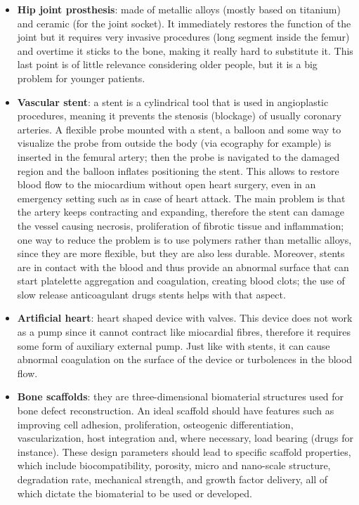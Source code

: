   \begin{multicols}{2}
    \begin{itemize}
      \item \textbf{Hip joint prosthesis}: made of metallic alloys (mostly based on titanium) and ceramic (for the joint socket).
        It immediately restores the function of the joint but it requires very invasive procedures (long segment inside the femur) and overtime it sticks to the bone, making it really hard to substitute it.
        This last point is of little relevance considering older people, but it is a big problem for younger patients.
      \item \textbf{Vascular stent}: a stent is a cylindrical tool that is used in angioplastic procedures, meaning it prevents the stenosis (blockage) of usually coronary arteries.
        A flexible probe mounted with a stent, a balloon and some way to visualize the probe from outside the body (via ecography for example) is inserted in the femural artery; then the probe is navigated to the damaged region and the balloon inflates positioning the stent.
        This allows to restore blood flow to the miocardium without open heart surgery, even in an emergency setting such as in case of heart attack.
        The main problem is that the artery keeps contracting and expanding, therefore the stent can damage the vessel causing necrosis, proliferation of fibrotic tissue and inflammation; one way to reduce the problem is to use polymers rather than metallic alloys, since they are more flexible, but they are also less durable.
        Moreover, stents are in contact with the blood and thus provide an abnormal surface that can start platelette aggregation and coagulation, creating blood clots; the use of slow release anticoagulant drugs stents helps with that aspect.
      \item \textbf{Artificial heart}: heart shaped device with valves.
        This device does not work as a pump since it cannot contract like miocardial fibres, therefore it requires some form of auxiliary external pump.
        Just like with stents, it can cause abnormal coagulation on the surface of the device or turbolences in the blood flow.
      \item \textbf{Bone scaffolds}: they are three-dimensional biomaterial structures used for bone defect reconstruction.
        An ideal scaffold should have features such as improving cell adhesion, proliferation, osteogenic differentiation, vascularization, host integration and, where necessary, load bearing (drugs for instance).
        These design parameters should lead to specific scaffold properties, which include biocompatibility, porosity, micro and nano-scale structure, degradation rate, mechanical strength, and growth factor delivery, all of which dictate the biomaterial to be used or developed.
    \end{itemize}
  \end{multicols}


